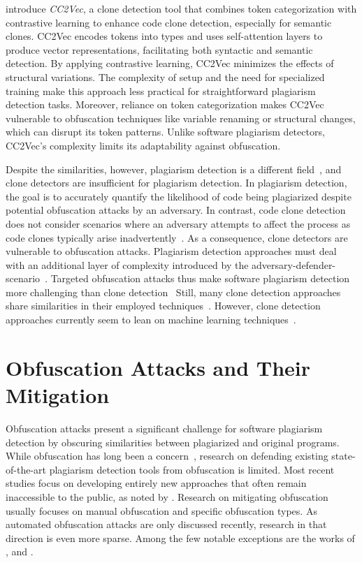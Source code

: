 \citet{Dou2024} introduce \textit{CC2Vec}, a clone detection tool that combines token categorization with contrastive learning to enhance code clone detection, especially for semantic clones. CC2Vec encodes tokens into types and uses self-attention layers to produce vector representations, facilitating both syntactic and semantic detection. By applying contrastive learning, CC2Vec minimizes the effects of structural variations.
%
The complexity of setup and the need for specialized training make this approach less practical for straightforward plagiarism detection tasks.
Moreover, reliance on token categorization makes CC2Vec vulnerable to obfuscation techniques like variable renaming or structural changes, which can disrupt its token patterns. Unlike software plagiarism detectors, CC2Vec's complexity limits its adaptability against obfuscation.


Despite the similarities, however, plagiarism detection is a different field~\cite{mariani2012}, and clone detectors are insufficient for plagiarism detection.
In plagiarism detection, the goal is to accurately quantify the likelihood of code being plagiarized despite potential obfuscation attacks by an adversary.
In contrast, code clone detection does not consider scenarios where an adversary attempts to affect the process as code clones typically arise inadvertently~\cite{juergens2009}. As a consequence, clone detectors are vulnerable to obfuscation attacks.
Plagiarism detection approaches must deal with an additional layer of complexity introduced by the adversary-defender-scenario~\cite{Saglam2024b}.
Targeted obfuscation attacks thus make software plagiarism detection more challenging than clone detection~\cite{mariani2012}
Still, many clone detection approaches share similarities in their employed techniques~\cite{wang2018, ly2017, Dou2024, white2016}.
However, clone detection approaches currently seem to lean on machine learning techniques~\cite{feng2024}.

\section{Obfuscation Attacks and Their Mitigation}
Obfuscation attacks present a significant challenge for software plagiarism detection by obscuring similarities between plagiarized and original programs. While obfuscation has long been a concern~\cite {zhang2014b, Karnalim2016, Novak2019}, research on defending existing state-of-the-art plagiarism detection tools from obfuscation is limited. Most recent studies focus on developing entirely new approaches that often remain inaccessible to the public, as noted by \citet{Novak2019}. Research on mitigating obfuscation usually focuses on manual obfuscation and specific obfuscation types.
As automated obfuscation attacks are only discussed recently, research in that direction is even more sparse.
Among the few notable exceptions are the works of \citet{DevoreMcDonald2020}, \citet{Biderman2022} and \citet{zhang2014b}.

